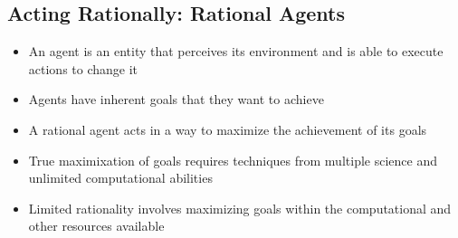 \documentclass[12pt]{article}
\begin{document}
\subsection*{Acting Rationally: Rational Agents}

\begin{itemize}
    \item An agent is an entity that perceives its environment and is able to execute actions to change it
    \item Agents have inherent goals that they want to achieve
    \item A rational agent acts in a way to maximize the achievement of its goals
    \item True maximixation of goals requires techniques from multiple science and unlimited computational abilities
    \item Limited rationality involves maximizing goals within the computational and other resources available
\end{itemize}
\end{document}
